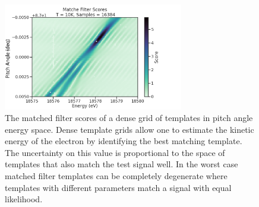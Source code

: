 \begin{figure}[htbp]
    \centering
    \includegraphics*[width=0.7\textwidth]{figs/Chapter-4/230725_example_mf_score_map.png}
    \caption{\label{fig:chap4-mf-score-dense-grid} The matched filter scores of a dense grid of templates in pitch angle energy space. Dense template grids allow one to estimate the kinetic energy of the electron by identifying the best matching template. The uncertainty on this value is proportional to the space of templates that also match the test signal well. In the worst case matched filter templates can be completely degenerate where templates with different parameters match a signal with equal likelihood. }
\end{figure}


